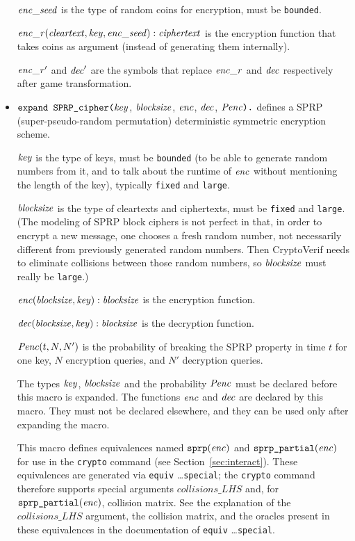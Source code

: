 \documentclass{article}
\begin{document}
\begin{itemize}
  $\mathit{enc\_seed}$ is the type of random coins for encryption, must be \texttt{bounded}.

  $\mathit{enc\_r}(\mathit{cleartext}, \mathit{key}, \mathit{enc\_seed}): \mathit{ciphertext}$ is the encryption function that takes coins as argument (instead of generating them internally).

  $\mathit{enc\_r}'$ and $\mathit{dec}'$ are the symbols that replace $\mathit{enc\_r}$ and $\mathit{dec}$ respectively after game transformation.


\item $\texttt{expand SPRP\_cipher(}\mathit{key}$,
$  \mathit{blocksize}$, $\mathit{enc}$, $\mathit{dec}$, $\mathit{Penc}\texttt{).}$
  defines a SPRP (super-pseudo-random permutation) deterministic
  symmetric encryption scheme.

   $\mathit{key}$ is the type of keys, must be \texttt{bounded} (to be able to generate random numbers from it, and to talk about the runtime of $\mathit{enc}$ without mentioning the length of the key), typically \texttt{fixed} and \texttt{large}.

   $\mathit{blocksize}$ is the type of cleartexts and ciphertexts, 
   must be \texttt{fixed} and \texttt{large}.
   (The modeling of SPRP block ciphers is not perfect in that, in
   order to encrypt a new message, one chooses a fresh random number,
   not necessarily different from previously generated random
   numbers. Then CryptoVerif needs to eliminate collisions between
   those random numbers, so $\mathit{blocksize}$ must really be
   \texttt{large}.)

   $\mathit{enc}(\mathit{blocksize}, \mathit{key}): \mathit{blocksize}$ is the encryption function.

   $\mathit{dec}(\mathit{blocksize}, \mathit{key}): \mathit{blocksize}$ is the
  decryption function.

  $\mathit{Penc}(t, N, N')$ is the probability of breaking the SPRP
  property in time $t$ for one key, $N$ encryption queries, and $N'$
  decryption queries.

  The types $\mathit{key}$, $\mathit{blocksize}$ and the
  probability $\mathit{Penc}$ must be declared before this macro is
  expanded. The functions $\mathit{enc}$ and $\mathit{dec}$ are
  declared by this macro. They must not be declared elsewhere, and
  they can be used only after expanding the macro.

   This macro defines equivalences named $\texttt{sprp}(\mathit{enc})$ and $\texttt{sprp\_partial}(\mathit{enc})$
   for use in the \texttt{crypto} command 
   (see Section~\ref{sec:interact}). These equivalences are generated via \texttt{equiv} \dots \texttt{special};
   the \texttt{crypto} command therefore supports special arguments $\mathit{collisions\_LHS}$ and, 
   for $\texttt{sprp\_partial}(\mathit{enc})$, collision matrix. See the explanation of the $\mathit{collisions\_LHS}$
   argument, the collision matrix, and the oracles present in these equivalences in the documentation of \texttt{equiv} \dots \texttt{special}.


\end{itemize}
\end{document}
